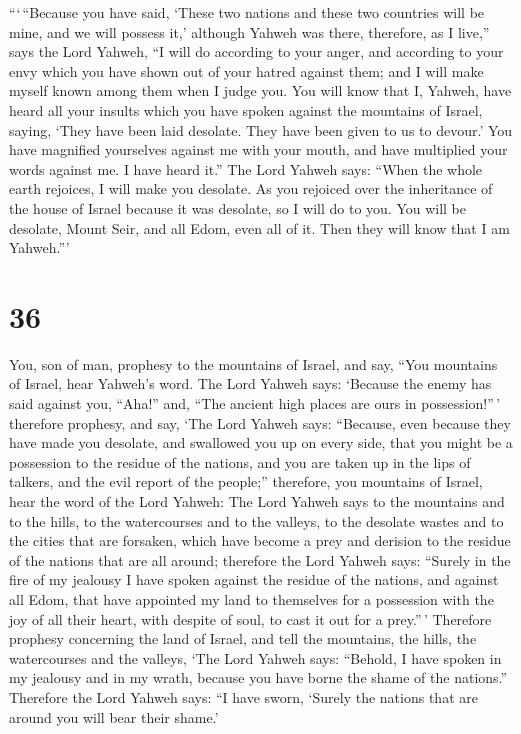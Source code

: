  ```\,``Because you have said, `These two nations and these
two countries will be mine, and we will possess it,' although Yahweh was
there,  therefore, as I live,'' says the Lord Yahweh, ``I
will do according to your anger, and according to your envy which you
have shown out of your hatred against them; and I will make myself known
among them when I judge you.  You will know that I, Yahweh,
have heard all your insults which you have spoken against the mountains
of Israel, saying, `They have been laid desolate. They have been given
to us to devour.'  You have magnified yourselves against me
with your mouth, and have multiplied your words against me. I have heard
it.''  The Lord Yahweh says: ``When the whole earth
rejoices, I will make you desolate.  As you rejoiced over
the inheritance of the house of Israel because it was desolate, so I
will do to you. You will be desolate, Mount Seir, and all Edom, even all
of it. Then they will know that I am Yahweh.'''

\hypertarget{section-34}{%
\section{36}\label{section-34}}

 You, son of man, prophesy to the mountains of Israel, and
say, ``You mountains of Israel, hear Yahweh's word.  The
Lord Yahweh says: `Because the enemy has said against you, ``Aha!'' and,
``The ancient high places are ours in possession!''\,' 
therefore prophesy, and say, `The Lord Yahweh says: ``Because, even
because they have made you desolate, and swallowed you up on every side,
that you might be a possession to the residue of the nations, and you
are taken up in the lips of talkers, and the evil report of the
people;''  therefore, you mountains of Israel, hear the word
of the Lord Yahweh: The Lord Yahweh says to the mountains and to the
hills, to the watercourses and to the valleys, to the desolate wastes
and to the cities that are forsaken, which have become a prey and
derision to the residue of the nations that are all around; 
therefore the Lord Yahweh says: ``Surely in the fire of my jealousy I
have spoken against the residue of the nations, and against all Edom,
that have appointed my land to themselves for a possession with the joy
of all their heart, with despite of soul, to cast it out for a
prey.''\,'  Therefore prophesy concerning the land of
Israel, and tell the mountains, the hills, the watercourses and the
valleys, `The Lord Yahweh says: ``Behold, I have spoken in my jealousy
and in my wrath, because you have borne the shame of the nations.''
 Therefore the Lord Yahweh says: ``I have sworn, `Surely the
nations that are around you will bear their shame.'

